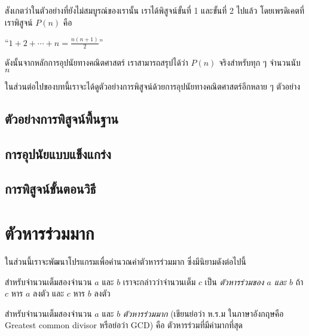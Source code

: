 สังเกต{\wbr}ว่า{\wbr}ใน{\wbr}ตัวอย่าง{\wbr}ที่{\wbr}ยัง{\wbr}ไม่{\wbr}สมบูรณ์{\wbr}ของ{\wbr}เรา{\wbr}นั้น เรา{\wbr}ได้{\wbr}พิสูจน์{\wbr}ขั้น{\wbr}ที่ 1 และ{\wbr}ขั้น{\wbr}ที่ 2 ไป{\wbr}แล้ว{\wbr}
โดย{\wbr}เพรดิเคต{\wbr}ที่{\wbr}เรา{\wbr}พิสูจน์ $ P(n) $ คือ{\wbr}

\begin{center}
``$ 1+2+\cdots+n = \frac{n(n+1)}{2} $''
\end{center}

ดังนั้น{\wbr}จาก{\wbr}หลักการ{\wbr}อุปนัย{\wbr}ทาง{\wbr}คณิตศาสตร์ เรา{\wbr}สามารถ{\wbr}สรุป{\wbr}ได้{\wbr}ว่า $ P(n) $ จริง{\wbr}สำหรับ{\wbr}ทุก ๆ
จำนวนนับ $ n $

ใน{\wbr}ส่วนต่อ{\wbr}ไป{\wbr}ของ{\wbr}บท{\wbr}นี้{\wbr}เรา{\wbr}จะ{\wbr}ได้{\wbr}ดู{\wbr}ตัวอย่าง{\wbr}การ{\wbr}พิสูจน์{\wbr}ด้วย{\wbr}การ{\wbr}อุปนัย{\wbr}ทาง{\wbr}คณิตศาสตร์{\wbr}อีก{\wbr}หลาย ๆ ตัวอย่าง{\wbr}

\subsection{ตัวอย่าง{\wbr}การ{\wbr}พิสูจน์{\wbr}พื้นฐาน}

\subsection{การ{\wbr}อุปนัย{\wbr}แบบ{\wbr}แข็งแกร่ง}

\subsection{การ{\wbr}พิสูจน์{\wbr}ขั้นตอนวิธี}

\section{ตัวหารร่วมมาก}

ใน{\wbr}ส่วน{\wbr}นี้{\wbr}เรา{\wbr}จะ{\wbr}พัฒนา{\wbr}โปรแกรม{\wbr}เพื่อ{\wbr}คำนวณ{\wbr}ค่าตัว{\wbr}หารร่วมมาก ซึ่ง{\wbr}มี{\wbr}นิยาม{\wbr}ดังต่อไปนี้{\wbr}

สำหรับ{\wbr}จำนวนเต็ม{\wbr}สอง{\wbr}จำนวน $a$ และ $b$ เรา{\wbr}จะ{\wbr}กล่าว{\wbr}ว่า{\wbr}จำนวนเต็ม $c$ เป็น {\em
ตัวหาร{\wbr}ร่วม{\wbr}ของ $a$ และ $b$} ถ้า $c$ หาร $a$ ลงตัว และ $c$ หาร $b$ ลงตัว{\wbr}

สำหรับ{\wbr}จำนวนเต็ม{\wbr}สอง{\wbr}จำนวน $a$ และ $b$ {\em ตัวหารร่วมมาก} (เขียน{\wbr}ย่อ{\wbr}ว่า ห.{\wbr}ร.{\wbr}ม
ใน{\wbr}ภาษาอังกฤษ{\wbr}คือ Greatest common divisor หรือ{\wbr}ย่อ{\wbr}ว่า GCD)  คือ{\wbr}
ตัวหาร{\wbr}ร่วม{\wbr}ที่{\wbr}มี{\wbr}ค่า{\wbr}มาก{\wbr}ที่สุด{\wbr}

